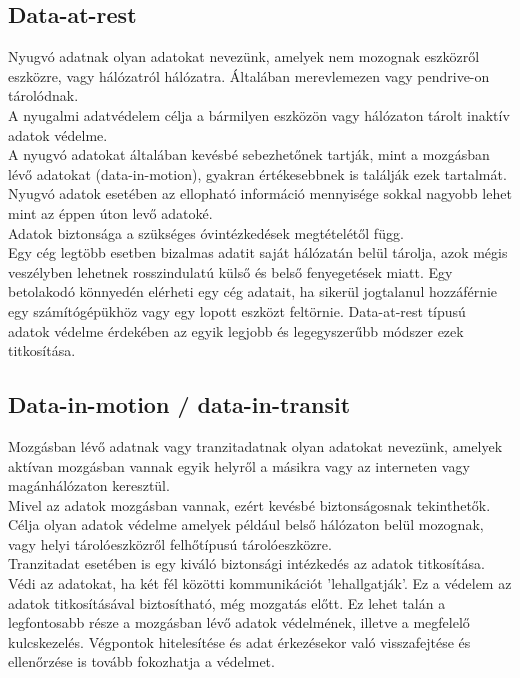 \subsection{Data-at-rest}
Nyugvó adatnak olyan adatokat nevezünk, amelyek nem mozognak eszközről eszközre, vagy hálózatról hálózatra. Általában merevlemezen vagy pendrive-on tárolódnak.
\vspace{5pt}\\A nyugalmi adatvédelem célja a bármilyen eszközön vagy hálózaton tárolt inaktív adatok védelme.
\vspace{5pt}\\A nyugvó adatokat általában kevésbé sebezhetőnek tartják, mint a mozgásban lévő adatokat (data-in-motion), gyakran értékesebbnek is találják ezek tartalmát. Nyugvó adatok esetében az ellopható információ mennyisége sokkal nagyobb lehet mint az éppen úton levő adatoké.
\vspace{5pt}\\Adatok biztonsága a szükséges óvintézkedések megtételétől függ.
\vspace{5pt}\\Egy cég legtöbb esetben bizalmas adatit saját hálózatán belül tárolja, azok mégis veszélyben lehetnek rosszindulatú külső és belső fenyegetések miatt. Egy betolakodó könnyedén elérheti egy cég adatait, ha sikerül jogtalanul hozzáférnie egy számítógépükhöz vagy egy lopott eszközt feltörnie.
Data-at-rest típusú adatok védelme érdekében az egyik legjobb és legegyszerűbb módszer ezek titkosítása.


\subsection{Data-in-motion / data-in-transit}
Mozgásban lévő adatnak vagy tranzitadatnak olyan adatokat nevezünk, amelyek aktívan mozgásban vannak egyik helyről a másikra vagy az interneten vagy magánhálózaton keresztül.
\vspace{5pt}\\Mivel az adatok mozgásban vannak, ezért kevésbé biztonságosnak tekinthetők. Célja olyan adatok védelme amelyek például belső hálózaton belül mozognak, vagy helyi tárolóeszközről felhőtípusú tárolóeszközre.
\vspace{5pt}\\Tranzitadat esetében is egy kiváló biztonsági intézkedés az adatok titkosítása. Védi az adatokat, ha két fél közötti kommunikációt ’lehallgatják’.
Ez a védelem az adatok titkosításával biztosítható, még mozgatás előtt. Ez lehet talán a legfontosabb része a mozgásban lévő adatok védelmének, illetve a megfelelő kulcskezelés. Végpontok hitelesítése és adat érkezésekor való visszafejtése és ellenőrzése is tovább fokozhatja a védelmet. 

